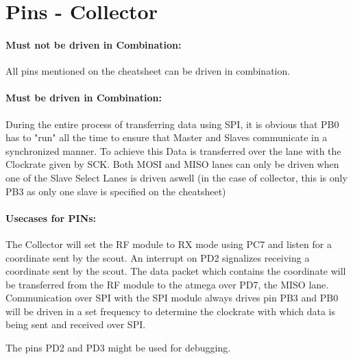 \documentclass[12pt]{article}
\begin{document}
\vspace{1cm}

\newpage
\section*{Pins - Collector}


\paragraph{Must not be driven in Combination:}
All pins mentioned on the cheatsheet can be driven in combination.

\paragraph{Must be driven in Combination:}
During the entire process of transferring data using SPI, it is obvious that PB0 has to "run" all the time to ensure that Master and Slaves communicate in a  synchronized manner. To achieve this Data is transferred over the lane with the Clockrate given by SCK. Both MOSI and MISO lanes can only be driven when one of the Slave Select Lanes is driven aswell (in the case of collector, this is only PB3 as only one slave is specified on the cheatsheet)

\paragraph{Usecases for PINs:}

The Collector will set the RF module to RX mode using PC7 and listen for a coordinate sent by the scout. An interrupt on PD2 signalizes receiving a coordinate sent by the scout. The data packet which contains the coordinate will be transferred from the RF module to the atmega over PD7, the MISO lane. Communication over SPI with the SPI module always drives pin PB3 and PB0 will be driven in a set frequency to determine the clockrate with which data is being sent and received over SPI.

The pins PD2 and PD3 might be used for debugging.
\end{document}
